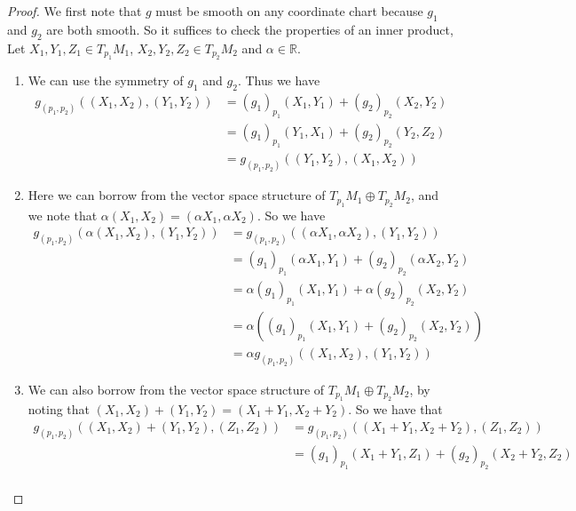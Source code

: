 \documentclass[a4paper]{article}
\begin{document}
\begin{proof}
  We first note that $g$ must be smooth on any coordinate chart because $g_1$ and $g_2$ are both smooth. So it suffices to check the properties of an inner product, Let $X_1,Y_1,Z_1 \in T_{p_1}M_1$, $X_2, Y_2, Z_2 \in T_{p_2}M_2$ and $\alpha \in \mathds{R}$.
  \begin{enumerate}
    \item We can use the symmetry of $g_1$ and $g_2$. Thus we have
      \[
        \begin{aligned}
          g_{(p_1,p_2)}((X_1,X_2),(Y_1,Y_2)) &= (g_1)_{p_1}(X_1,Y_1) +  (g_2)_{p_2}(X_2, Y_2) \\
                                             &= (g_1)_{p_1}(Y_1,X_1) +  (g_2)_{p_2}(Y_2, Z_2) \\
                                             &= g_{(p_1,p_2)}((Y_1,Y_2),(X_1,X_2))
        \end{aligned}
      \]
    \item Here we can borrow from the vector space structure of $T_{p_1}M_1 \oplus T_{p_2}M_2$, and we note that 
      $\alpha(X_1, X_2) = (\alpha X_1, \alpha X_2)$. So we have
      \[
        \begin{aligned}
          g_{(p_1,p_2)}(\alpha(X_1,X_2),(Y_1,Y_2))  &= g_{(p_1,p_2)}((\alpha X_1,\alpha X_2),(Y_1,Y_2)) \\
                                                    &= (g_1)_{p_1}(\alpha X_1,Y_1) +  (g_2)_{p_2}(\alpha X_2, Y_2) \\
                                                    &= \alpha (g_1)_{p_1}(X_1,Y_1) +  \alpha (g_2)_{p_2}(X_2, Y_2) \\
                                                    &= \alpha \left( (g_1)_{p_1}(X_1,Y_1) +  (g_2)_{p_2}(X_2, Y_2)\right) \\
                                                    &= \alpha g_{(p_1,p_2)}((X_1,X_2),(Y_1,Y_2)) 
        \end{aligned}
      \]
    \item We can also borrow from the vector space structure of $T_{p_1}M_1 \oplus T_{p_2}M_2$, by noting that $(X_1, X_2) + (Y_1, Y_2) = (X_1 + Y_1, X_2 + Y_2)$. So we have that
    \[
      \begin{aligned}
        g_{(p_1,p_2)}((X_1,X_2) + (Y_1, Y_2),(Z_1,Z_2))  &=  g_{(p_1,p_2)}((X_1 + Y_1, X_2 + Y_2),(Z_1,Z_2))   \\
                                                         &=  (g_1)_{p_1}(X_1 + Y_1, Z_1) +  (g_2)_{p_2}(X_2 + Y_2, Z_2) \\

\end{aligned}\]
\end{enumerate}
\end{proof}
\end{document}
